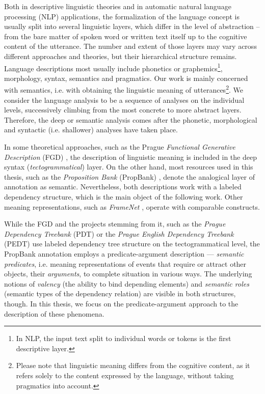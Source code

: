 \documentclass[12pt,notitlepage]{report}
\begin{document}
Both in descriptive linguistic theories and in automatic natural language processing (NLP) applications, the formalization of the language concept is usually split into several linguistic layers, which differ in the level of abstraction -- from the bare matter of spoken word or written text itself up to the cognitive content of the utterance. The number and extent of those layers may vary across different approaches and theories, but their hierarchical structure remains. Language descriptions most usually include phonetics or graphemics\footnote{In NLP, the input text split to individual words or tokens is the first descriptive layer.}, morphology, syntax, semantics and pragmatics. Our work is mainly concerned with semantics, i.e. with obtaining the linguistic meaning \citep[p. 35ff.]{sgall86} of utterances\footnote{Please note that linguistic meaning differs from the cognitive content, as it refers solely to the content expressed by the language, without taking pragmatics into account.}. We consider the language analysis to be a sequence of analyses on the individual levels, successively climbing from the most concrete to more abstract layers. Therefore, the deep or semantic analysis comes after the phonetic, morphological and syntactic (i.e. shallower) analyses have taken place.

In some theoretical approaches, such as the Prague \emph{Functional Generative Description} (FGD) \citep{sgall86}, the description of linguistic meaning is included in the deep syntax (\emph{tectogrammatical}) layer. On the other hand, most resources used in this thesis, such as the \emph{Proposition Bank} (PropBank) \linebreak[4] \citep{palmer05}, denote the analogical layer of annotation as semantic. Nevertheless, both descriptions work with a labeled dependency structure, which is the main object of the following work. Other meaning representations, such as \emph{Frame\-Net} \citep{baker98}, operate with comparable constructs.

While the FGD and the projects stemming from it, such as the \emph{Prague Dependency Treebank} (PDT) \citep{hajic06} or the \emph{Prague English Dependency Treebank} (PEDT) \citep{cinkova09} use labeled dependency tree structure on the tectogrammatical level, the PropBank annotation \citep{kingsbury03} employs a predicate-argument description --- \emph{semantic predicates}, i.e. meaning representations of events that require or attract other objects, their \emph{arguments}, to complete situation in various ways. The underlying notions of \emph{valency} (the ability to bind depending elements) and \emph{semantic roles} \citep[cf. e.g.][p. 123]{gildea02,carreras05,sgall86} (semantic types of the dependency relation) are visible in both structures, though. In this thesis, we focus on the predicate-argument approach to the description of these phenomena.
\end{document}
